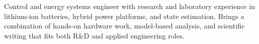 
\begin{cvparagraph}

Control and energy systems engineer with research and laboratory experience in lithium-ion batteries, hybrid power platforms, and state estimation. Brings a combination of hands-on hardware work, model-based analysis, and scientific writing that fits both R\&D and applied engineering roles.

\end{cvparagraph}
